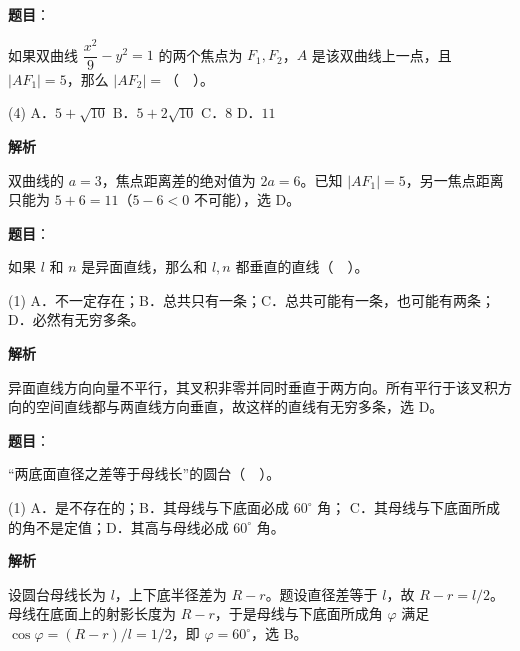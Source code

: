 \begin{answer}

\textbf{题目}：

如果双曲线 $\dfrac{x^2}9-y^2=1$ 的两个焦点为 $F_1,F_2$，$A$ 是该双曲线上一点，且 $|AF_1|=5$，那么 $|AF_2|=$（　）。

\begin{gkopts}(4)
\task A．$5+\sqrt{10}$
\task B．$5+2\sqrt{10}$
\task C．$8$
\task D．$11$
\end{gkopts}

\textbf{解析}

双曲线的 $a=3$，焦点距离差的绝对值为 $2a=6$。已知 $|AF_1|=5$，另一焦点距离只能为 $5+6=11$（$5-6<0$ 不可能），选 D。


\end{answer}
\begin{answer}

\textbf{题目}：

如果 $l$ 和 $n$ 是异面直线，那么和 $l,n$ 都垂直的直线（　）。

\begin{gkopts}(1)
\task A．不一定存在；B．总共只有一条；C．总共可能有一条，也可能有两条；D．必然有无穷多条。
\end{gkopts}

\textbf{解析}

异面直线方向向量不平行，其叉积非零并同时垂直于两方向。所有平行于该叉积方向的空间直线都与两直线方向垂直，故这样的直线有无穷多条，选 D。


\end{answer}
\begin{answer}

\textbf{题目}：

“两底面直径之差等于母线长”的圆台（　）。

\begin{gkopts}(1)
\task A．是不存在的；B．其母线与下底面必成 $60^\circ$ 角；
\task C．其母线与下底面所成的角不是定值；D．其高与母线必成 $60^\circ$ 角。
\end{gkopts}

\textbf{解析}

设圆台母线长为 $l$，上下底半径差为 $R-r$。题设直径差等于 $l$，故 $R-r=l/2$。母线在底面上的射影长度为 $R-r$，于是母线与下底面所成角 $\varphi$ 满足 $\cos\varphi=(R-r)/l=1/2$，即 $\varphi=60^\circ$，选 B。


\end{answer}
